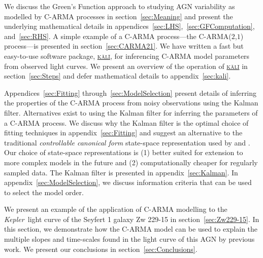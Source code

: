 \documentclass[a4paper,fleqn,usenatbib]{mnras}
\newcommand{\Kepler}{\textit{Kepler~}}
\begin{document}
We discuss the Green's Function approach to studying AGN variability as modelled by C-ARMA processes in section~\ref{sec:Meaning} and present the underlying mathematical details in appendices~\ref{sec:LHS},~\ref{sec:GFComputation}, and~\ref{sec:RHS}. A simple example of a C-ARMA process---the C-ARMA($2$,$1$) process---is presented in section~\ref{sec:CARMA21}. We have written a fast but easy-to-use software package, \href{https://github.com/AstroVPK/kali}{\textsc{k\={a}l\={i}}}, for inferencing C-ARMA model parameters from observed light curves. We present an overview of the operation of \href{https://github.com/AstroVPK/kali}{\textsc{k\={a}l\={i}}} in section~\ref{sec:Steps} and defer mathematical details to appendix~\ref{sec:kali}.

Appendices~\ref{sec:Fitting} through~\ref{sec:ModelSelection} present details of inferring the properties of the C-ARMA process from noisy observations using the Kalman filter. Alternatives exist to using the Kalman filter for inferring the parameters of a C-ARMA process. We discuss why the Kalman filter is the optimal choice of fitting techniques in appendix~\ref{sec:Fitting}
and suggest an alternative to the traditional \textit{controllable canonical form} state-space representation used by \citet{JonesAckerson90} and \citet{Brockwell14}. Our choice of state-space representations is (1) better suited for extension to more complex models in the future and (2) computationally cheaper for regularly sampled data. The Kalman filter is presented in appendix~\ref{sec:Kalman}. In appendix~\ref{sec:ModelSelection}, we discuss information criteria that can be used to select the model order.

We present an example of the application of C-ARMA modelling to the \Kepler light curve of the Seyfert 1 galaxy Zw 229-15 in section~\ref{sec:Zw229-15}. In this section, we demonstrate how the C-ARMA model can be used to explain the multiple slopes and time-scales found in the light curve of this AGN by previous work. We present our conclusions in section~\ref{sec:Conclusions}.
\end{document}
